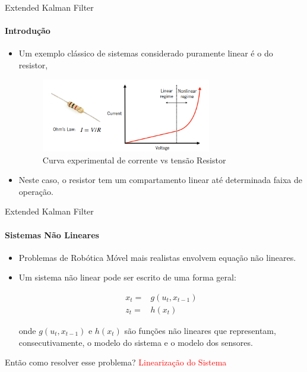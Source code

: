 \documentclass[aspectratio=169]{beamer}
\begin{document}
\begin{frame}[c]{Extended Kalman Filter}
    \framesubtitle{Introdução}
    \begin{itemize}
        \item Um exemplo clássico de sistemas considerado puramente linear é o do resistor,


    \begin{figure}
        \centering
        \includegraphics[width=0.7\textwidth]{./images/resistor_curve.png}
        \caption{Curva experimental de corrente vs tensão Resistor}
    \end{figure}

        \item Neste caso, o resistor tem um compartamento linear até determinada faixa de operação.
    \end{itemize}
\end{frame}


\begin{frame}[t]{Extended Kalman Filter}
    \framesubtitle{Sistemas Não Lineares}

    \begin{itemize}
        \item Problemas de Robótica Móvel mais realistas envolvem equação não lineares.
        \item Um sistema não linear pode ser escrito de uma forma geral:
        
        \begin{equation}
            \begin{split}
            x_t = & g(u_t, x_{t-1})\\
            z_t = & h(x_t)
            \end{split}
        \end{equation}
    
    onde $g(u_t, x_{t-1})$ e $h(x_t)$ são funções não lineares que representam, consecutivamente, 
    o modelo do sistema e o modelo dos sensores.

    \end{itemize}

    \begin{block}{Então como resolver esse problema?}
        \centering
        \Large{\textcolor{red}{Linearização do Sistema}}
    \end{block}

\end{frame}
\end{document}
